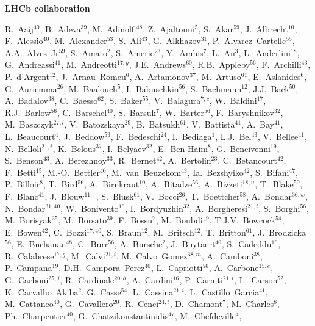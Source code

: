 \centerline{\large\bf LHCb collaboration}
\begin{flushleft}
\small
R.~Aaij$^{40}$,
B.~Adeva$^{39}$,
M.~Adinolfi$^{48}$,
Z.~Ajaltouni$^{5}$,
S.~Akar$^{59}$,
J.~Albrecht$^{10}$,
F.~Alessio$^{40}$,
M.~Alexander$^{53}$,
S.~Ali$^{43}$,
G.~Alkhazov$^{31}$,
P.~Alvarez~Cartelle$^{55}$,
A.A.~Alves~Jr$^{59}$,
S.~Amato$^{2}$,
S.~Amerio$^{23}$,
Y.~Amhis$^{7}$,
L.~An$^{3}$,
L.~Anderlini$^{18}$,
G.~Andreassi$^{41}$,
M.~Andreotti$^{17,g}$,
J.E.~Andrews$^{60}$,
R.B.~Appleby$^{56}$,
F.~Archilli$^{43}$,
P.~d'Argent$^{12}$,
J.~Arnau~Romeu$^{6}$,
A.~Artamonov$^{37}$,
M.~Artuso$^{61}$,
E.~Aslanides$^{6}$,
G.~Auriemma$^{26}$,
M.~Baalouch$^{5}$,
I.~Babuschkin$^{56}$,
S.~Bachmann$^{12}$,
J.J.~Back$^{50}$,
A.~Badalov$^{38}$,
C.~Baesso$^{62}$,
S.~Baker$^{55}$,
V.~Balagura$^{7,c}$,
W.~Baldini$^{17}$,
R.J.~Barlow$^{56}$,
C.~Barschel$^{40}$,
S.~Barsuk$^{7}$,
W.~Barter$^{56}$,
F.~Baryshnikov$^{32}$,
M.~Baszczyk$^{27,l}$,
V.~Batozskaya$^{29}$,
B.~Batsukh$^{61}$,
V.~Battista$^{41}$,
A.~Bay$^{41}$,
L.~Beaucourt$^{4}$,
J.~Beddow$^{53}$,
F.~Bedeschi$^{24}$,
I.~Bediaga$^{1}$,
L.J.~Bel$^{43}$,
V.~Bellee$^{41}$,
N.~Belloli$^{21,i}$,
K.~Belous$^{37}$,
I.~Belyaev$^{32}$,
E.~Ben-Haim$^{8}$,
G.~Bencivenni$^{19}$,
S.~Benson$^{43}$,
A.~Berezhnoy$^{33}$,
R.~Bernet$^{42}$,
A.~Bertolin$^{23}$,
C.~Betancourt$^{42}$,
F.~Betti$^{15}$,
M.-O.~Bettler$^{40}$,
M.~van~Beuzekom$^{43}$,
Ia.~Bezshyiko$^{42}$,
S.~Bifani$^{47}$,
P.~Billoir$^{8}$,
T.~Bird$^{56}$,
A.~Birnkraut$^{10}$,
A.~Bitadze$^{56}$,
A.~Bizzeti$^{18,u}$,
T.~Blake$^{50}$,
F.~Blanc$^{41}$,
J.~Blouw$^{11,\dagger}$,
S.~Blusk$^{61}$,
V.~Bocci$^{26}$,
T.~Boettcher$^{58}$,
A.~Bondar$^{36,w}$,
N.~Bondar$^{31,40}$,
W.~Bonivento$^{16}$,
I.~Bordyuzhin$^{32}$,
A.~Borgheresi$^{21,i}$,
S.~Borghi$^{56}$,
M.~Borisyak$^{35}$,
M.~Borsato$^{39}$,
F.~Bossu$^{7}$,
M.~Boubdir$^{9}$,
T.J.V.~Bowcock$^{54}$,
E.~Bowen$^{42}$,
C.~Bozzi$^{17,40}$,
S.~Braun$^{12}$,
M.~Britsch$^{12}$,
T.~Britton$^{61}$,
J.~Brodzicka$^{56}$,
E.~Buchanan$^{48}$,
C.~Burr$^{56}$,
A.~Bursche$^{2}$,
J.~Buytaert$^{40}$,
S.~Cadeddu$^{16}$,
R.~Calabrese$^{17,g}$,
M.~Calvi$^{21,i}$,
M.~Calvo~Gomez$^{38,m}$,
A.~Camboni$^{38}$,
P.~Campana$^{19}$,
D.H.~Campora~Perez$^{40}$,
L.~Capriotti$^{56}$,
A.~Carbone$^{15,e}$,
G.~Carboni$^{25,j}$,
R.~Cardinale$^{20,h}$,
A.~Cardini$^{16}$,
P.~Carniti$^{21,i}$,
L.~Carson$^{52}$,
K.~Carvalho~Akiba$^{2}$,
G.~Casse$^{54}$,
L.~Cassina$^{21,i}$,
L.~Castillo~Garcia$^{41}$,
M.~Cattaneo$^{40}$,
G.~Cavallero$^{20}$,
R.~Cenci$^{24,t}$,
D.~Chamont$^{7}$,
M.~Charles$^{8}$,
Ph.~Charpentier$^{40}$,
G.~Chatzikonstantinidis$^{47}$,
M.~Chefdeville$^{4}$,

\end{flushleft}
